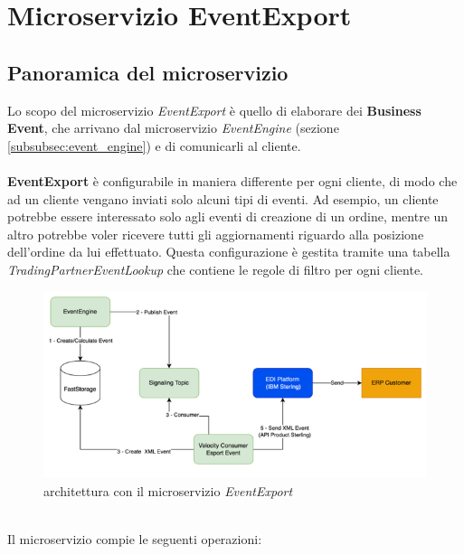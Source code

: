 \chapter{Microservizio EventExport}
\label{cap:MicroservizioEventExport}

\section{Panoramica del microservizio}
\label{sec:ScopoDelMicroservizio}
Lo scopo del microservizio \textit{EventExport} è quello di elaborare dei \textbf{Business Event}, che arrivano dal microservizio \textit{EventEngine} 
(sezione \ref{subsubsec:event_engine}) e di comunicarli al cliente.\\\\
\textbf{EventExport} è configurabile in maniera differente per ogni cliente, di modo che ad un cliente vengano inviati solo alcuni tipi di eventi.
Ad esempio, un cliente potrebbe essere interessato solo agli eventi di creazione di un ordine, mentre un altro potrebbe voler ricevere tutti gli aggiornamenti
riguardo alla posizione dell'ordine da lui effettuato.
Questa configurazione è gestita tramite una tabella \textit{TradingPartnerEventLookup} che contiene le regole di filtro per ogni cliente.
\begin{figure}[htbp]
    \centering
    \includegraphics[width=\textwidth]{images/EventExport/EventExport_architecture.png}
    \caption{architettura con il microservizio \textit{EventExport}}
    \label{fig:EventExport_architecture}
\end{figure}\\
Il microservizio compie le seguenti operazioni:
